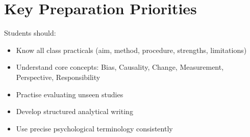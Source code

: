 \documentclass[12pt,a4paper]{article}
\begin{document}
\section*{Key Preparation Priorities}

Students should:
\begin{itemize}
    \item Know all class practicals (aim, method, procedure, strengths, limitations)
    \item Understand core concepts:
    Bias, Causality, Change, Measurement, Perspective, Responsibility
    \item Practise evaluating unseen studies
    \item Develop structured analytical writing
    \item Use precise psychological terminology consistently
\end{itemize}
\end{document}
